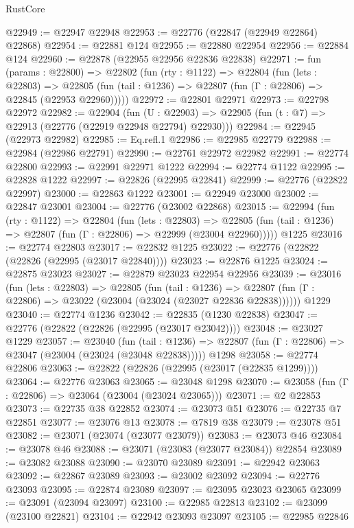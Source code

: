 \begin{lexlean}{RustCore}
\begin{coremodule}
@22949 := @22947 @22948
@22953 := @22776 (@22847 (@22949 @22864) @22868)
@22954 := @22881 @124
@22955 := @22880 @22954
@22956 := @22884 @124
@22960 := @22878 (@22955 @22956 @22836 @22838)
@22971 := fun (params : @22800) =>
  @22802
    (fun (rty : @1122) =>
    @22804
      (fun (lets : @22803) =>
      @22805 (fun (tail : @1236) => @22807 (fun (Γ : @22806) => @22845 (@22953 @22960)))))
@22972 := @22801 @22971
@22973 := @22798 @22972
@22982 := @22904
    (fun (U : @22903) => @22905 (fun (t : @7) => @22913 (@22776 (@22919 @22948 @22794) @22930)))
@22984 := @22945 (@22973 @22982)
@22985 := Eq.refl.{1}
@22986 := @22985 @22779
@22988 := @22984 (@22986 @22791)
@22990 := @22761 @22972 @22982
@22991 := @22774 @22800
@22993 := @22991 @22971 @1222
@22994 := @22774 @1122
@22995 := @22828 @1222
@22997 := @22826 (@22995 @22841)
@22999 := @22776 (@22822 @22997)
@23000 := @22863 @1222
@23001 := @22949 @23000
@23002 := @22847 @23001
@23004 := @22776 (@23002 @22868)
@23015 := @22994
    (fun (rty : @1122) =>
    @22804
      (fun (lets : @22803) =>
      @22805 (fun (tail : @1236) => @22807 (fun (Γ : @22806) => @22999 (@23004 @22960)))))
    @1225
@23016 := @22774 @22803
@23017 := @22832 @1225
@23022 := @22776 (@22822 (@22826 (@22995 (@23017 @22840))))
@23023 := @22876 @1225
@23024 := @22875 @23023
@23027 := @22879 @23023 @22954 @22956
@23039 := @23016
    (fun (lets : @22803) =>
    @22805
      (fun (tail : @1236) =>
      @22807 (fun (Γ : @22806) => @23022 (@23004 (@23024 (@23027 @22836 @22838))))))
    @1229
@23040 := @22774 @1236
@23042 := @22835 (@1230 @22838)
@23047 := @22776 (@22822 (@22826 (@22995 (@23017 @23042))))
@23048 := @23027 @1229
@23057 := @23040
    (fun (tail : @1236) => @22807 (fun (Γ : @22806) => @23047 (@23004 (@23024 (@23048 @22838)))))
    @1298
@23058 := @22774 @22806
@23063 := @22822 (@22826 (@22995 (@23017 (@22835 @1299))))
@23064 := @22776 @23063
@23065 := @23048 @1298
@23070 := @23058 (fun (Γ : @22806) => @23064 (@23004 (@23024 @23065)))
@23071 := @2 @22853
@23073 := @22735 @38 @22852
@23074 := @23073 @51
@23076 := @22735 @7 @22851
@23077 := @23076 @13
@23078 := @7819 @38
@23079 := @23078 @51
@23082 := @23071 (@23074 (@23077 @23079))
@23083 := @23073 @46
@23084 := @23078 @46
@23088 := @23071 (@23083 (@23077 @23084)) @22854
@23089 := @23082 @23088
@23090 := @23070 @23089
@23091 := @22942 @23063
@23092 := @22867 @23089
@23093 := @23002 @23092
@23094 := @22776 @23093
@23095 := @22874 @23089
@23097 := @23095 @23023 @23065
@23099 := @23091 (@23094 @23097)
@23100 := @22985 @22813
@23102 := @23099 (@23100 @22821)
@23104 := @22942 @23093 @23097
@23105 := @22985 @22846

\end{coremodule}
\end{lexlean}
